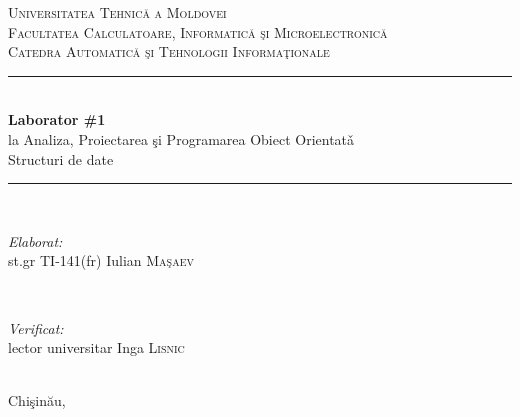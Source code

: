 \documentclass[12pt]{article}
\begin{document}
\begin{titlepage}

\newcommand{\HRule}{\rule{\linewidth}{0.5mm}} 

\center 
 

\textsc{\LARGE Universitatea Tehnic\u{a} a Moldovei}\\[0.8cm] 
\textsc{\Large Facultatea Calculatoare, Informatic\u{a} \c{s}i Microelectronic\u{a}}\\[0.5cm] 
\textsc{\large Catedra Automatic\u{a} \c{s}i Tehnologii Informa\c{t}ionale}\\[5.2cm] 


\HRule \\[0.4cm]
{ \huge \bfseries Laborator \#1}\\[0.3cm]
{\large la Analiza, Proiectarea \c{s}i Programarea Obiect Orientat\v{a}}\\
{\large Structuri de date}\\[0.4cm] 
\HRule \\[5.5cm]
 

\begin{minipage}{0.4\textwidth}
\begin{flushleft} \large
\emph{Elaborat:}\\
st.gr TI-141(fr) Iulian \textsc{Ma\c{s}aev} 
\end{flushleft}
\end{minipage}
~
\begin{minipage}{0.4\textwidth}
\begin{flushright} \large
\emph{Verificat:} \\
lector universitar Inga \textsc{Lisnic} 
\end{flushright}
\end{minipage}\\[4cm]


\vfill 
{\large Chi\c{s}in\u{a}u, \the\year}\\[3cm] 



\end{titlepage}

%


%


\end{document}
